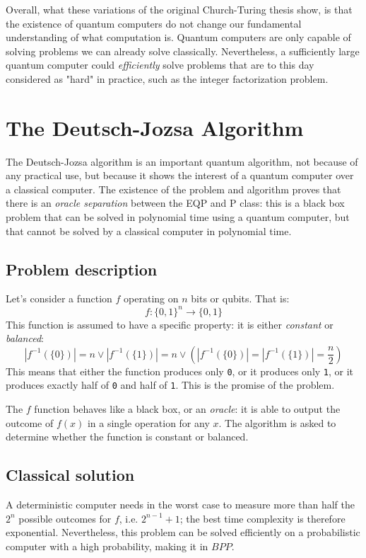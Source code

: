 \documentclass[12pt,a4paper]{article}
\theoremstyle{plain}
\theoremstyle{definition}
\begin{document}
Overall, what these variations of the original Church-Turing thesis show, is that the existence of quantum computers do not change our fundamental understanding of what computation is. Quantum computers are only capable of solving problems we can already solve classically. Nevertheless, a sufficiently large quantum computer could \emph{efficiently} solve problems that are to this day considered as "hard" in practice, such as the integer factorization problem.

\section{The Deutsch-Jozsa Algorithm}
The Deutsch-Jozsa algorithm\cite{deutsch-jozsa} is an important quantum algorithm, not because of any practical use, but because it shows the interest of a quantum computer over a classical computer. The existence of the problem and algorithm proves that there is an \emph{oracle separation} between the EQP and P class: this is a black box problem that can be solved in polynomial time using a quantum computer, but that cannot be solved by a classical computer in polynomial time.

\subsection{Problem description}
Let's consider a function $f$ operating on $n$ bits or qubits. That is:
\begin{equation*}
    f : \{ 0, 1 \}^n \to \{ 0, 1 \}
\end{equation*}
This function is assumed to have a specific property: it is either \emph{constant} or \emph{balanced}:
\begin{equation*}
    |f^{-1}(\{0\})| = n \lor |f^{-1}(\{1\})| = n \lor \left(|f^{-1}(\{0\})| = |f^{-1}(\{1\})| = \frac{n}{2}\right)
\end{equation*}
This means that either the function produces only \texttt{0}, or it produces only \texttt{1}, or it produces exactly half of \texttt{0} and half of \texttt{1}. This is the promise of the problem.

The $f$ function behaves like a black box, or an \emph{oracle}: it is able to output the outcome of $f(x)$ in a single operation for any $x$. The algorithm is asked to determine whether the function is constant or balanced.

\subsection{Classical solution}
A deterministic computer needs in the worst case to measure more than half the $2^n$ possible outcomes for $f$, i.e. $2^{n-1}+1$; the best time complexity is therefore exponential. Nevertheless, this problem can be solved efficiently on a probabilistic computer with a high probability, making it in $BPP$.
\end{document}
